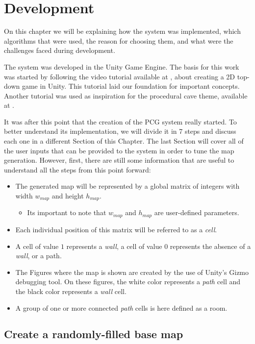 \chapter{Development}
\label{chapter:dev}

On this chapter we will be explaining how the system was implemented, which algorithms that were used, the reason for choosing them, and what were the challenges faced during development.

The system was developed in the Unity Game Engine. The basis for this work was started by following the video tutorial available at \textcite{taft:2019}, about creating a 2D top-down game in Unity. This tutorial laid our foundation for important concepts. Another tutorial was used as inspiration for the procedural cave theme, available at \textcite{sebastian:2015}.

It was after this point that the creation of the PCG system really started. To better understand its implementation, we will divide it in 7 steps and discuss each one in a different Section of this Chapter. The last Section will cover all of the user inputs that can be provided to the system in order to tune the map generation. However, first, there are still some information that are useful to understand all the steps from this point forward: 
\begin{itemize}
    \item The generated map will be represented by a global matrix of integers with width \(w_{map}\) and height \(h_{map}\).
    \begin{itemize}
        \item Its important to note that \(w_{map}\) and \(h_{map}\) are user-defined parameters.
    \end{itemize}
    \item Each individual position of this matrix will be referred to as a \emph{cell}.
    \item A cell of value \(1\) represents a \emph{wall}, a cell of value \(0\) represents the absence of a \emph{wall}, or a path.
    \item The Figures where the map is shown are created by the use of Unity's Gizmo debugging tool. On these figures, the white color represents a \emph{path} cell and the black color represents a \emph{wall} cell.
    \item A group of one or more connected \emph{path} cells is here defined as a room.
\end{itemize}

\section{Create a randomly-filled base map}
\label{sec:randomf}

